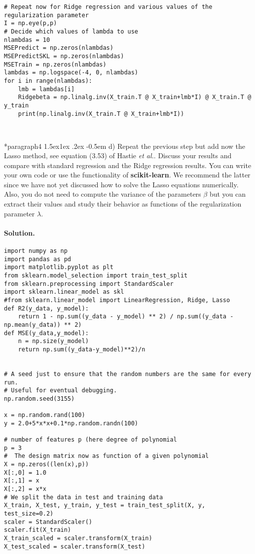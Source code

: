 \documentclass[%
oneside,                 %
final,                   %
10pt]{article}
\makeatletter
\newenvironment{doconceexercise}{}{}
\newcommand\subex{\@startsection*{paragraph}{4}{\z@}%
                  {1.5ex\@plus1ex \@minus.2ex}%
                  {-0.5em}%
                  {\normalfont\normalsize\bfseries}}
\makeatother
\begin{document}
\begin{doconceexercise}
\begin{verbatim}
# Repeat now for Ridge regression and various values of the regularization parameter
I = np.eye(p,p)
# Decide which values of lambda to use
nlambdas = 10
MSEPredict = np.zeros(nlambdas)
MSEPredictSKL = np.zeros(nlambdas)
MSETrain = np.zeros(nlambdas)
lambdas = np.logspace(-4, 0, nlambdas)
for i in range(nlambdas):
    lmb = lambdas[i]
    Ridgebeta = np.linalg.inv(X_train.T @ X_train+lmb*I) @ X_train.T @ y_train
    print(np.linalg.inv(X_train.T @ X_train+lmb*I))



\end{verbatim}


\subex{d)}
Repeat the previous step but add now the Lasso method, see equation (3.53) of Hastie \emph{et al.}. Discuss your results and compare with standard regression and the Ridge regression results. You can write your own code or use the functionality of \textbf{scikit-learn}.  We recommend the latter since we have not yet discussed how to solve the Lasso equations numerically. Also, you do not need to compute the variance of the parameters $\beta$ but you can extract their values and study their behavior as functions of the regularization parameter $\lambda$.


\paragraph{Solution.}
\begin{verbatim}
import numpy as np
import pandas as pd
import matplotlib.pyplot as plt
from sklearn.model_selection import train_test_split
from sklearn.preprocessing import StandardScaler
import sklearn.linear_model as skl
#from sklearn.linear_model import LinearRegression, Ridge, Lasso
def R2(y_data, y_model):
    return 1 - np.sum((y_data - y_model) ** 2) / np.sum((y_data - np.mean(y_data)) ** 2)
def MSE(y_data,y_model):
    n = np.size(y_model)
    return np.sum((y_data-y_model)**2)/n


# A seed just to ensure that the random numbers are the same for every run.
# Useful for eventual debugging.
np.random.seed(3155)

x = np.random.rand(100)
y = 2.0+5*x*x+0.1*np.random.randn(100)

# number of features p (here degree of polynomial
p = 3
#  The design matrix now as function of a given polynomial
X = np.zeros((len(x),p))
X[:,0] = 1.0
X[:,1] = x
X[:,2] = x*x
# We split the data in test and training data
X_train, X_test, y_train, y_test = train_test_split(X, y, test_size=0.2)
scaler = StandardScaler()
scaler.fit(X_train)
X_train_scaled = scaler.transform(X_train)
X_test_scaled = scaler.transform(X_test)


\end{verbatim}
\end{doconceexercise}
\end{document}
